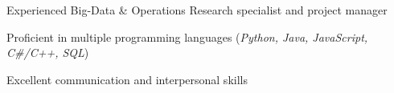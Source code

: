 

\cventry
{} %
{} %
{} %
{} %
{
\begin{cvitems} 	%
	\item  {Experienced Big-Data \& Operations Research specialist and project manager}
	\item  {Proficient in multiple programming languages (\textit{Python, Java, JavaScript, C\#/C++, SQL})} 
	\item  {Excellent communication and interpersonal skills} 
\end{cvitems}
}


